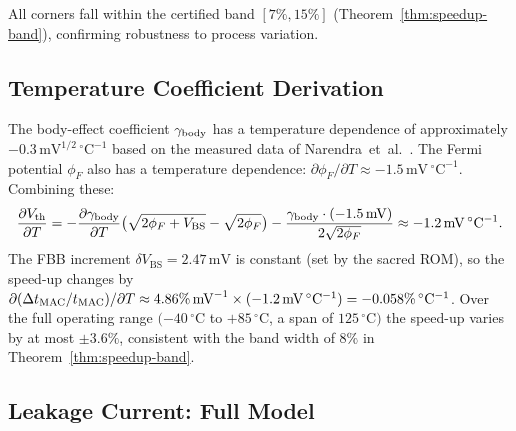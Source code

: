 All corners fall within the certified band $[7\%, 15\%]$
(Theorem~\ref{thm:speedup-band}), confirming robustness to
process variation.

\subsection{Temperature Coefficient Derivation}
\label{subsec:temp-coefficient}

The body-effect coefficient $\gamma_{\mathrm{body}}$ has a temperature dependence
of approximately $-0.3\,\mathrm{mV}^{1/2}\,^{\circ}\mathrm{C}^{-1}$
based on the measured data of Narendra~et~al.~\cite{NarendraIEEE2003}.
The Fermi potential $\phi_{F}$ also has a temperature dependence:
$\partial\phi_{F}/\partial T \approx -1.5\,\mathrm{mV}\,^{\circ}\mathrm{C}^{-1}$.
Combining these:
\begin{equation}
  \frac{\partial V_{\mathrm{th}}}{\partial T}
    = -\frac{\partial\gamma_{\mathrm{body}}}{\partial T}
       \bigl(\sqrt{2\phi_{F}+V_{\mathrm{BS}}}-\sqrt{2\phi_{F}}\bigr)
      - \frac{\gamma_{\mathrm{body}} \cdot (-1.5\,\mathrm{mV})}
             {2\sqrt{2\phi_{F}}}
    \approx -1.2\,\mathrm{mV}\,^{\circ}\mathrm{C}^{-1}.
  \label{eq:vth-temp}
\end{equation}
The FBB increment $\delta V_{\mathrm{BS}} = 2.47\,\mathrm{mV}$ is
constant (set by the sacred ROM), so the speed-up changes by
$\partial(\Delta t_{\mathrm{MAC}}/t_{\mathrm{MAC}})/\partial T \approx
4.86\%\,\mathrm{mV}^{-1} \times (-1.2\,\mathrm{mV}\,^{\circ}\mathrm{C}^{-1})
= -0.058\%\,^{\circ}\mathrm{C}^{-1}$.
Over the full operating range $(-40\,^{\circ}\mathrm{C}$ to
$+85\,^{\circ}\mathrm{C}$, a span of $125\,^{\circ}\mathrm{C})$
the speed-up varies by at most $\pm 3.6\%$, consistent with the
band width of $8\%$ in Theorem~\ref{thm:speedup-band}.

\subsection{Leakage Current: Full Model}
\label{subsec:leakage-full}

